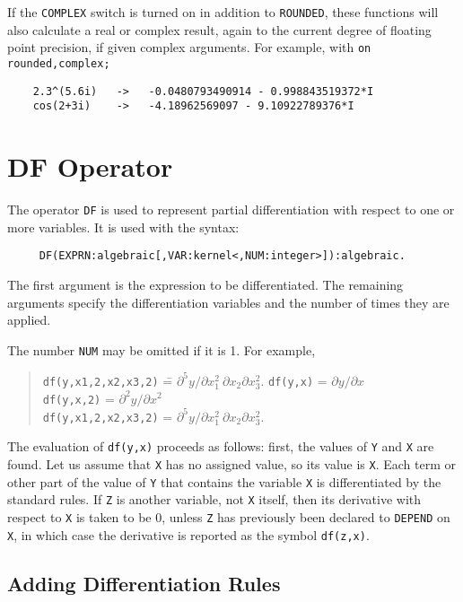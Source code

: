 If the {\tt COMPLEX} switch is turned on in addition to {\tt ROUNDED},
these functions will also calculate a real or complex result, again to
the current degree of floating point precision,
if given complex arguments.  For example, with {\tt on rounded,complex;}
\begin{verbatim}
	2.3^(5.6i)   ->   -0.0480793490914 - 0.998843519372*I
	cos(2+3i)    ->   -4.18962569097 - 9.10922789376*I
\end{verbatim}

\section{DF Operator}
\hypertarget{operator:DF}{}
The operator {\tt DF} is used to represent partial
differentiation with respect
to one or more variables. It is used with the syntax:
\begin{verbatim}
     DF(EXPRN:algebraic[,VAR:kernel<,NUM:integer>]):algebraic.
\end{verbatim}
The first argument is the expression to be differentiated. The remaining
arguments specify the differentiation variables and the number of times
they are applied.

The number {\tt NUM} may be omitted if it is 1.  For example,
\begin{quote}
\begin{tabbing}
{\tt            df(y,x1,2,x2,x3,2)} \= = $\partial^{5}y/\partial x_{1}^{2} \
 \partial x_{2}\partial x_{3}^{2}.$\kill
{\tt            df(y,x)} \> = $\partial y/\partial x$ \\
{\tt            df(y,x,2)} \> = $\partial^{2}y/\partial x^{2}$ \\
{\tt            df(y,x1,2,x2,x3,2)} \> = $\partial^{5}y/\partial x_{1}^{2} \
 \partial x_{2}\partial x_{3}^{2}.$
\end{tabbing}
\end{quote}
The evaluation of {\tt df(y,x)} proceeds as follows: first, the values of
{\tt Y} and {\tt X} are found.  Let us assume that {\tt X} has no assigned
value, so its value is {\tt X}.  Each term or other part of the value of
{\tt Y} that contains the variable {\tt X} is differentiated by the
standard rules.  If {\tt Z} is another variable, not {\tt X} itself, then
its derivative with respect to {\tt X} is taken to be 0, unless {\tt Z}
has previously been declared to {\tt DEPEND} on {\tt X}, in which
case the derivative is reported as the symbol {\tt df(z,x)}.


\subsection{Adding Differentiation Rules}
\hypertarget{command:LET}{}

